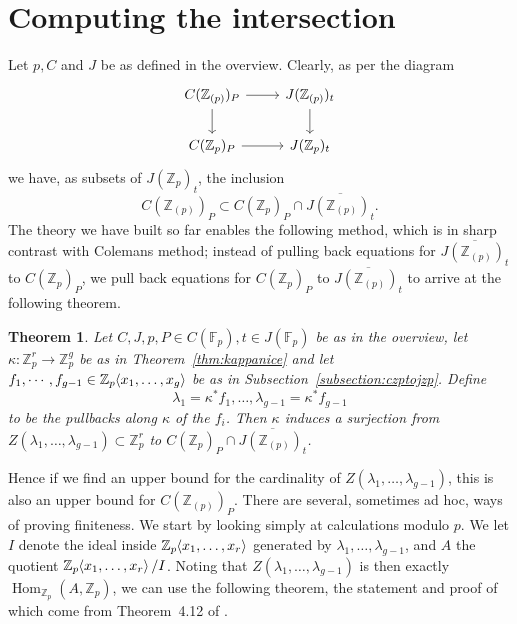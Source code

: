 \documentclass[12pt]{article}
\newcommand{\Z}{\mathbb{Z}}
\newcommand{\F}{\mathbb{F}}
\renewcommand{\angle}[1]{\hspace{-2pt}\left\langle #1 \right\rangle}
\DeclareMathOperator{\Hom}{Hom}
\theoremstyle{plain}
\newtheorem{thm}{Theorem}[section] %
\theoremstyle{definition}
\theoremstyle{remark}
\begin{document}
\section{Computing the intersection}
\label{section:intersection}
Let $p,C$ and $J$ be as defined in the overview. Clearly, as per the diagram \[
\begin{tikzcd}
C(\Z_{(p)})_P \arrow[d] \arrow[r] & J(\Z_{(p)})_t \arrow[d] \\
C(\Z_p)_P \arrow[r]              & J(\Z_p)_t        
\end{tikzcd}
\]
we have, as subsets of $J(\Z_p)_t$, the inclusion \[C(\Z_{(p)})_P \subset C(\Z_p)_P \cap \overline{J(\Z_{(p)})_t}.\]
The theory we have built so far enables the following method, which is in sharp contrast with Colemans method; instead of pulling back equations for $\overline{J(\Z_{(p)})_t}$ to $C(\Z_p)_P$, we pull back equations for $C(\Z_p)_P$ to $\overline{J(\Z_{(p)})_t}$ to arrive at the following theorem.
\begin{thm}
\label{thm:final}
Let $C,J,p,P\in C(\F_p),t\in J(\F_p)$ be as in the overview, let $\kappa: \Z_p^r \to \Z_p^g$ be as in Theorem~\ref{thm:kappanice} and let $f_1,\cdots,f_{g-1} \in \Z_p\angle{x_1,\dots,x_g}$ be as in Subsection~\ref{subsection:czptojzp}. Define \[\lambda_1 = \kappa^*f_1,\dots,\lambda_{g-1} = \kappa^*f_{g-1}\] to be the pullbacks along $\kappa$ of the $f_i$. Then $\kappa$ induces a surjection from $Z(\lambda_1,\dots,\lambda_{g-1}) \subset \Z_p^r$ to $C(\Z_p)_P \cap \overline{J(\Z_{(p)})_t}$.
\end{thm}

Hence if we find an upper bound for the cardinality of $Z(\lambda_1,\dots,\lambda_{g-1})$, this is also an upper bound for $C(\Z_{(p)})_P$. There are several, sometimes ad hoc, ways of proving finiteness. We start by looking simply at calculations modulo $p$. We let $I$ denote the ideal inside $\Z_p\angle{x_1,\dots,x_r}$ generated by $\lambda_1,\dots,\lambda_{g-1}$, and $A$ the quotient $\Z_p\angle{x_1,\dots,x_r}/I$. Noting that $Z(\lambda_1,\dots,\lambda_{g-1})$ is then exactly $\Hom_{\Z_p}(A,\Z_p)$, we can use the following theorem, the statement and proof of which come from Theorem~4.12 of \cite{edixhoven20}.
\end{document}
